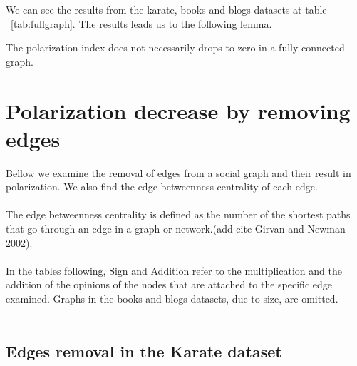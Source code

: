 \vspace{20pt}
\noindent
We can see the results from the karate, books and blogs datasets at table ~\ref{tab:fullgraph}. The results leads us to the following lemma.
\\	
\begin{lemma}
The polarization index does not necessarily drops to zero in a fully connected graph.
\end{lemma}


\section{Polarization decrease by removing edges}
\label{sec:polremovingdecrease}
Bellow we examine the removal of edges from a social graph and their result in polarization. We also find the edge betweenness centrality of each edge. 
\\
\\
The edge betweenness centrality is defined as the number of the shortest paths that go through an edge in a graph or network.(add cite Girvan and Newman 2002). 
\\
\\
In the tables following, Sign and Addition refer to the multiplication and the addition of the opinions of the nodes that are attached to the specific edge examined. Graphs in the books and blogs datasets, due to size, are omitted.
\\
\\

\subsection{Edges removal in the Karate dataset}

